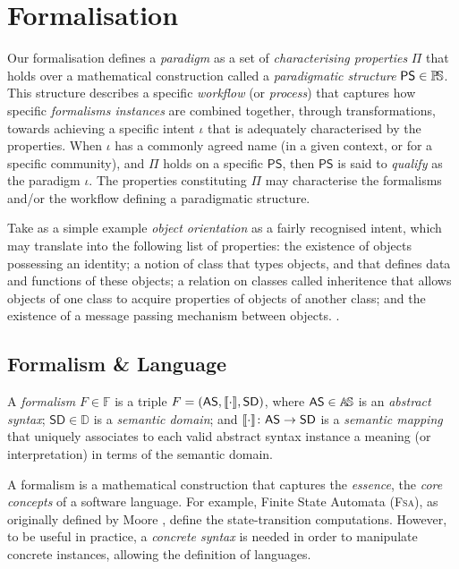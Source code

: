 \section{Formalisation}
\label{sec:Formalisation}

Our formalisation defines a \emph{paradigm} as a set of 
\emph{characterising properties} $\mathsf{\Pi}$ that holds over a mathematical 
construction called a \emph{paradigmatic structure} $\mathsf{PS}\in \mathbb{P}\!\mathbb{S}$. 
This structure describes a specific \emph{workflow} (or \emph{process}) that 
captures how specific \emph{formalisms instances} are combined together, 
through transformations, towards achieving a specific intent $\iota$ that is 
adequately characterised by the properties. When $\iota$ has a commonly agreed 
name (in a given context, or for a specific community), and $\mathsf{\Pi}$ holds 
on a specific $\mathsf{PS}$, then $\mathsf{PS}$ is said to \emph{qualify} as 
the paradigm $\iota$. The properties constituting $\mathsf{\Pi}$ may 
characterise the formalisms and/or the workflow defining a paradigmatic 
structure. 

Take as a simple example \emph{object orientation} as a fairly recognised 
intent, which may translate into the following list of properties: the 
existence of objects possessing an identity; a notion of class that types 
objects, and that defines data and functions of these objects; a relation on 
classes called inheritence that allows objects of one class to acquire 
properties of objects of another class; and the existence of a message passing 
mechanism between objects. 
. 

\subsection{Formalism \& Language}
\label{sec:Formalism-Language}

\begin{Definition}[Formalism]
   A \emph{formalism} $F\in\mathbb{F}$ is a triple $F = (\mathsf{AS}, 
\llbracket \cdot \rrbracket , \mathsf{SD})$, where $\mathsf{AS}\in\mathbb{A}\!\mathbb{S}$ is an \emph{abstract 
syntax}; $\mathsf{SD}\in\mathbb{D}$ is a \emph{semantic domain}; and $\llbracket \cdot \rrbracket  
\colon \mathsf{AS} \to \mathsf{SD}$ is a \emph{semantic mapping} that uniquely 
associates to each valid abstract syntax instance a meaning (or interpretation) 
in terms of the semantic domain.
\end{Definition}
A formalism is a mathematical construction that captures the \emph{essence}, 
the \emph{core concepts} of a software language. For example, Finite State 
Automata (\textsc{Fsa}), as originally defined by Moore \cite{J:Moore:1956}, 
define the 
state-transition computations. However, to be useful in practice, a 
\emph{concrete syntax} is needed in order to manipulate concrete instances, 
allowing the definition of languages.

